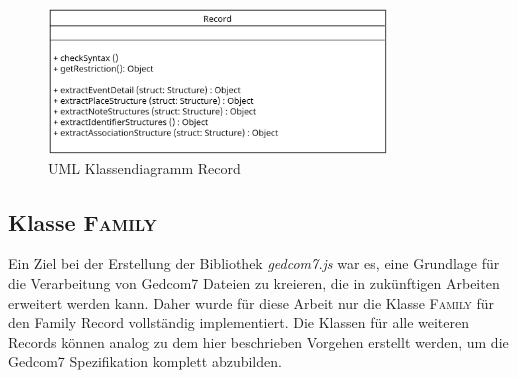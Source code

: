 \begin{figure}[h]
	\centering
	\includegraphics[width=0.8\textwidth]{images/UML_Class_Record.png}
	\caption{UML Klassendiagramm Record}
	\label{fig: UML Klassendiagramm Record}
\end{figure}

\label{subsec: Implementierung - Gedcom Struktur - Klasse Family}
\subsection{Klasse \textsc{Family}}
Ein Ziel bei der Erstellung der Bibliothek \textit{gedcom7.js} war es, eine Grundlage für die Verarbeitung von Gedcom7 Dateien zu kreieren, die in zukünftigen Arbeiten erweitert werden kann. Daher wurde für diese Arbeit nur die Klasse \textsc{Family} für den Family Record vollständig implementiert. Die Klassen für alle weiteren Records können analog zu dem hier beschrieben Vorgehen erstellt werden, um die Gedcom7 Spezifikation komplett abzubilden. 


